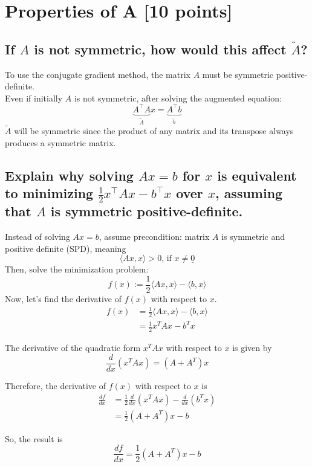 \documentclass[unicode,11pt,a4paper,oneside,numbers=endperiod,openany]{scrartcl}
\begin{document}
\section{Properties of A [10 points]}

\subsection{If $A$ is not symmetric, how would this affect $\tilde{A}$?}

To use the conjugate gradient method, the matrix $A$ must be symmetric positive-definite.\\
Even if initially $A$ is not symmetric, after solving the augmented equation:
\[
    \underbrace{A^\intercal A}_{\tilde{A}} x = \underbrace{A^\intercal b}_{\tilde{b}}
\]
$\tilde{A}$ will be symmetric since the product of any matrix and its transpose
always produces a symmetric matrix.\\

\subsection{Explain why solving $Ax = b$ for $x$ is equivalent to minimizing
    $\frac{1}{2}x^\intercal Ax - b^\intercal x$ over $x$,
    assuming that $A$ is symmetric positive-definite.}

Instead of solving $Ax = b$,
assume precondition:
matrix $A$ is symmetric and positive definite (SPD), meaning
\[ \langle Ax, x \rangle > 0 \text{, if } x \neq \underline{0} \]
Then, solve the minimization problem:
\[ f(x) := \frac{1}{2} \langle Ax, x \rangle - \langle b, x \rangle \]
Now, let's find the derivative of $f(x)$ with respect to $x$.
\begin{align*}
    f(x) & = \frac{1}{2} \langle Ax, x \rangle - \langle b, x \rangle \\
         & = \frac{1}{2} x^T A x - b^T x
\end{align*}

The derivative of the quadratic form $x^T A x$ with respect to $x$ is given by
\[ \frac{d}{dx}(x^T A x) = (A + A^T)x \]

Therefore, the derivative of $f(x)$ with respect to $x$ is
\begin{align*}
    \frac{df}{dx} & = \frac{1}{2} \frac{d}{dx}(x^T A x) - \frac{d}{dx}(b^T x) \\
                  & = \frac{1}{2} (A + A^T)x - b
\end{align*}

So, the result is
\[ \frac{df}{dx} = \frac{1}{2} (A + A^T)x - b \]
\end{document}
